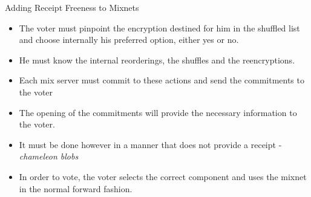 \documentclass{beamer}
\begin{document}
\begin{frame}[allowframebreaks]{Adding Receipt Freeness to Mixnets \cite{SK95}}
\begin{itemize}
\framebreak

\item The voter must pinpoint the encryption destined for him in the shuffled list and choose internally his preferred option, either yes or no.
\item He must know the internal reorderings, the shuffles and the reencryptions. 
\item Each mix server must commit to these actions and send the commitments to the voter
\item The opening of the commitments will provide the necessary information to the voter.
\item It must be done however in a manner that does not provide a receipt - \textit{chameleon blobs}
\item In order to vote, the voter selects the correct component and uses the mixnet in the normal forward fashion. 
\end{itemize}

\end{frame}
\end{document}
